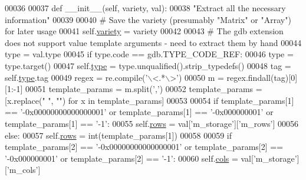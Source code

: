 \begin{DoxyCode}
00036 
00037     \textcolor{keyword}{def }\_\_init\_\_(self, variety, val):
00038         \textcolor{stringliteral}{"Extract all the necessary information"}
00039         
00040         \textcolor{comment}{# Save the variety (presumably "Matrix" or "Array") for later usage}
00041         self.\hyperlink{classgdb_1_1printers_1_1_eigen_matrix_printer_a706e8682ab610f25271e997cfbacabce}{variety} = variety
00042         
00043         \textcolor{comment}{# The gdb extension does not support value template arguments - need to extract them by hand}
00044         type = val.type
00045         \textcolor{keywordflow}{if} type.code == gdb.TYPE\_CODE\_REF:
00046             type = type.target()
00047         self.\hyperlink{classgdb_1_1printers_1_1_eigen_matrix_printer_a6fc3a15662e000efb3e2cbd7341d98b9}{type} = type.unqualified().strip\_typedefs()
00048         tag = self.\hyperlink{classgdb_1_1printers_1_1_eigen_matrix_printer_a6fc3a15662e000efb3e2cbd7341d98b9}{type}.tag
00049         regex = re.compile(\textcolor{stringliteral}{'\(\backslash\)<.*\(\backslash\)>'})
00050         m = regex.findall(tag)[0][1:-1]
00051         template\_params = m.split(\textcolor{stringliteral}{','})
00052         template\_params = [x.replace(\textcolor{stringliteral}{" "}, \textcolor{stringliteral}{""}) \textcolor{keywordflow}{for} x \textcolor{keywordflow}{in} template\_params]
00053         
00054         \textcolor{keywordflow}{if} template\_params[1] == \textcolor{stringliteral}{'-0x00000000000000001'} \textcolor{keywordflow}{or} template\_params[1] == \textcolor{stringliteral}{'-0x000000001'} \textcolor{keywordflow}{or} 
      template\_params[1] == \textcolor{stringliteral}{'-1'}:
00055             self.\hyperlink{classgdb_1_1printers_1_1_eigen_matrix_printer_a318702910d600ddbdf9527dd7eae3f30}{rows} = val[\textcolor{stringliteral}{'m\_storage'}][\textcolor{stringliteral}{'m\_rows'}]
00056         \textcolor{keywordflow}{else}:
00057             self.\hyperlink{classgdb_1_1printers_1_1_eigen_matrix_printer_a318702910d600ddbdf9527dd7eae3f30}{rows} = int(template\_params[1])
00058         
00059         \textcolor{keywordflow}{if} template\_params[2] == \textcolor{stringliteral}{'-0x00000000000000001'} \textcolor{keywordflow}{or} template\_params[2] == \textcolor{stringliteral}{'-0x000000001'} \textcolor{keywordflow}{or} 
      template\_params[2] == \textcolor{stringliteral}{'-1'}:
00060             self.\hyperlink{classgdb_1_1printers_1_1_eigen_matrix_printer_a77a2e4064d4a319804a7854a1210134c}{cols} = val[\textcolor{stringliteral}{'m\_storage'}][\textcolor{stringliteral}{'m\_cols'}]

\end{DoxyCode}
